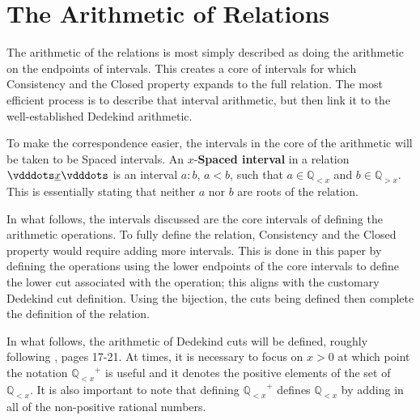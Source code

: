 \documentclass{rmj-public}
\newcommand{\qcut}[2][x]{\ensuremath{\mathbb{Q}_{#2 #1}}}
\newcommand{\qlt}[1][x]{\qcut[#1]{<}}
\newcommand{\qgt}[1][x]{\qcut[#1]{>}}
\begin{document}
\section{The Arithmetic of Relations}

The arithmetic of the relations is most simply described as doing the arithmetic on the endpoints of intervals. This creates a core of intervals for which Consistency and the Closed property expands to the full relation. The most efficient process is to describe that interval arithmetic, but then link it to the well-established Dedekind arithmetic. 

To make the correspondence easier, the intervals in the core of the arithmetic will be taken to be Spaced intervals. An $x$-\textbf{Spaced interval} in a relation $\xrel$ is an interval $a:b$, $a < b$, such that $a \in \qlt$ and $b \in \qgt$. This is essentially stating that neither $a$ nor $b$ are roots of the relation. 

In what follows, the intervals discussed are the core intervals of defining the arithmetic operations. To fully define the relation, Consistency and the Closed property would require adding more intervals. This is done in this paper by defining the operations using the lower endpoints of the core intervals to define the lower cut associated with the operation; this aligns with the customary Dedekind cut definition. Using the bijection, the cuts being defined then complete the definition of the relation.  

In what follows, the arithmetic of Dedekind cuts will be defined, roughly following \cite{rudin}, pages 17-21.  At times, it is necessary to focus on $x > 0$ at which point the notation $\qlt^+$ is useful and it denotes the positive elements of the set of $\qlt$. It is also important to note that defining $\qlt^+$ defines $\qlt$ by adding in all of the non-positive rational numbers.
\end{document}
